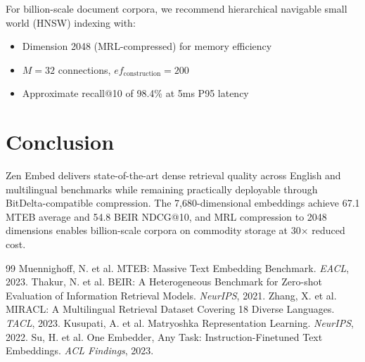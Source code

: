 \documentclass[11pt,a4paper]{article}
\begin{document}
For billion-scale document corpora, we recommend hierarchical navigable small world (HNSW) indexing with:
\begin{itemize}
  \item Dimension 2048 (MRL-compressed) for memory efficiency
  \item $M=32$ connections, $ef_\text{construction}=200$
  \item Approximate recall@10 of 98.4\% at 5ms P95 latency
\end{itemize}

\section{Conclusion}

Zen Embed delivers state-of-the-art dense retrieval quality across English and multilingual benchmarks while remaining practically deployable through BitDelta-compatible compression. The 7,680-dimensional embeddings achieve 67.1 MTEB average and 54.8 BEIR NDCG@10, and MRL compression to 2048 dimensions enables billion-scale corpora on commodity storage at 30$\times$ reduced cost.

\begin{thebibliography}{99}
 Muennighoff, N. et al. MTEB: Massive Text Embedding Benchmark. \textit{EACL}, 2023.
 Thakur, N. et al. BEIR: A Heterogeneous Benchmark for Zero-shot Evaluation of Information Retrieval Models. \textit{NeurIPS}, 2021.
 Zhang, X. et al. MIRACL: A Multilingual Retrieval Dataset Covering 18 Diverse Languages. \textit{TACL}, 2023.
 Kusupati, A. et al. Matryoshka Representation Learning. \textit{NeurIPS}, 2022.
 Su, H. et al. One Embedder, Any Task: Instruction-Finetuned Text Embeddings. \textit{ACL Findings}, 2023.
\end{thebibliography}
\end{document}
